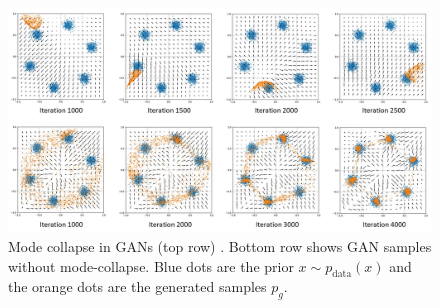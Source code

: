 \begin{figure}
    \centering
    \includegraphics[width=\textwidth]{images/gan_mode_collapse.png}
    \caption{Mode collapse in GANs (top row) \cite{gan_mode_collapse_image_source}. Bottom row shows GAN samples without mode-collapse. Blue dots are the prior $x \sim p_{\text{data}}(x)$ and the orange dots are the generated samples $p_g$.}
    \label{fig:gan_mode_collapse}
\end{figure}
